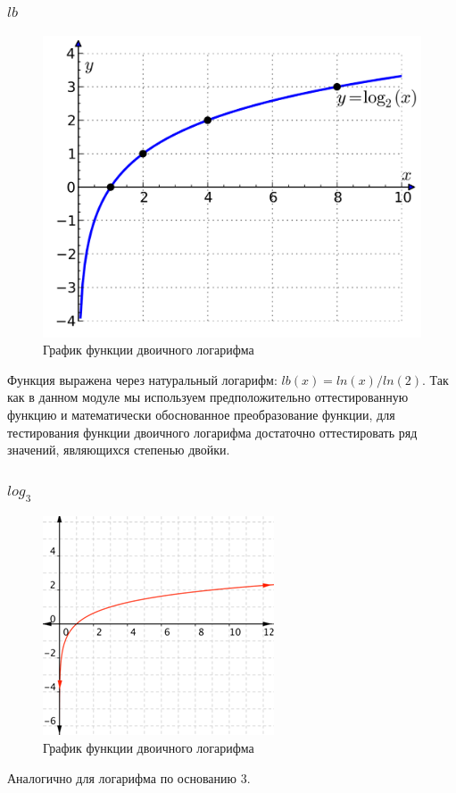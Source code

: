 \documentclass[a4paper,10pt]{article}
\begin{document}
		\subsubsection*{$lb$}
	    	\begin{figure}[h!]
    			\caption{График функции  двоичного логарифма}
    			\includegraphics[scale=0.1]{./images/lb.png}
    		\end{figure} 
    		Функция выражена через натуральный логарифм: $lb(x) = ln(x)/ln(2)$.
    		Так как в данном модуле мы используем предположительно оттестированную функцию и математически обоснованное
    		преобразование функции, для тестирования функции двоичного логарифма достаточно оттестировать ряд значений,
    		являющихся степенью двойки.
		\subsubsection*{$log_3$}
	    	\begin{figure}[h!]
    			\caption{График функции  двоичного логарифма}
    			\includegraphics[scale=0.5]{./images/log3.png}
    		\end{figure} 
			Аналогично для логарифма по основанию 3.
\end{document}
